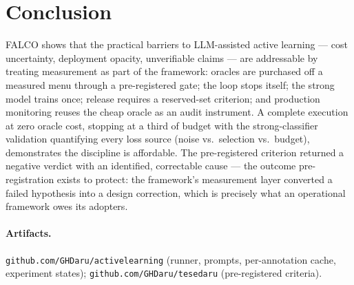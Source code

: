 \documentclass[11pt]{article}
\begin{document}
\section{Conclusion}
\label{sec:conclusion}

FALCO shows that the practical barriers to LLM-assisted active learning
--- cost uncertainty, deployment opacity, unverifiable claims --- are
addressable by treating measurement as part of the framework: oracles
are purchased off a measured menu through a pre-registered gate; the
loop stops itself; the strong model trains once; release requires a
reserved-set criterion; and production monitoring reuses the cheap
oracle as an audit instrument. A complete execution at zero oracle cost,
stopping at a third of budget with the strong-classifier validation
quantifying every loss source (noise vs.\ selection vs.\ budget),
demonstrates the discipline is affordable. The pre-registered criterion
returned a negative verdict with an identified, correctable cause --- the
outcome pre-registration exists to protect: the framework's measurement
layer converted a failed hypothesis into a design correction, which is
precisely what an operational framework owes its adopters.

\paragraph{Artifacts.} \texttt{github.com/GHDaru/activelearning}
(runner, prompts, per-annotation cache, experiment states);
\texttt{github.com/GHDaru/tesedaru} (pre-registered criteria).



\end{document}
